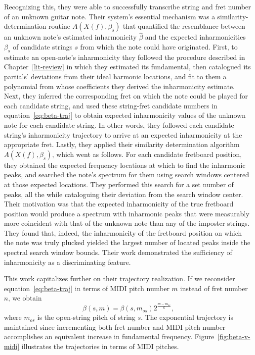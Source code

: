 \documentclass[12pt]{cmuthesis}
\begin{document}
Recognizing this, they were able to successfully transcribe string and fret number of an unknown guitar note. Their system's essential mechanism was a similarity-determination routine $A(X(f),\beta_s)$ that quantified the resemblance between an unknown note's estimated inharmonicity $\hat{\beta}$ and the expected inharmonicities $\beta_s$ of candidate strings $s$ from which the note could have originated. First, to estimate an open-note's inharmonicity they followed the procedure described in Chapter~\ref{lit-review} in which they estimated its fundamental, then catalogued its partials' deviations from their ideal harmonic locations, and fit to them a polynomial from whose coefficients they derived the inharmonicity estimate. Next, they inferred the corresponding fret on which the note could be played for each candidate string, and used these string-fret candidate numbers in equation~\eqref{eq:beta-traj} to obtain expected inharmonicity values of the unknown note for each candidate string. In other words, they followed each candidate string's inharmonicity trajectory to arrive at an expected inharmonicity at the appropriate fret. Lastly, they applied their similarity determination algorithm $A(X(f),\beta_s)$, which went as follows. For each candidate fretboard position, they obtained the expected frequency locations at which to find the inharmonic peaks, and searched the note's spectrum for them using search windows centered at those expected locations. They performed this search for a set number of peaks, all the while cataloguing their deviation from the search window center. Their motivation was that the expected inharmonicity of the true fretboard position would produce a spectrum with inharmonic peaks that were measurably more coincident with that of the unknown note than any of the imposter strings. They found that, indeed, the inharmonicity of the fretboard position on which the note was truly plucked yielded the largest number of located peaks inside the spectral search window bounds. Their work demonstrated the sufficiency of inharmonicity as a discriminating feature.

This work capitalizes further on their trajectory realization. If we reconsider equation~\eqref{eq:beta-traj} in terms of MIDI pitch number $m$ instead of fret number $n$, we obtain
\begin{equation}
\beta(s,m) = \beta(s,m_{os})2^{\frac{m-m_{os}}{6}},
\end{equation}
where $m_{os}$ is the open-string pitch of string $s$. The exponential trajectory is maintained since incrementing both fret number and MIDI pitch number accomplishes an equivalent increase in fundamental frequency. Figure~\ref{fig:beta-v-midi} illustrates the trajectories in terms of MIDI pitches.
\end{document}

